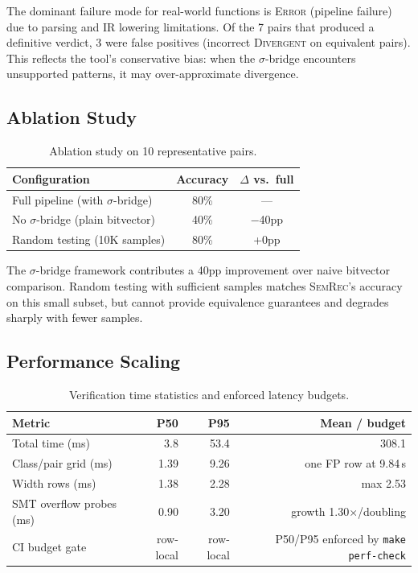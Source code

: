 \documentclass[10pt,a4paper]{article}
\begin{document}
\begin{appendices}
The dominant failure mode for real-world functions is \textsc{Error}
(pipeline failure) due to parsing and IR lowering limitations.
Of the 7 pairs that produced a definitive verdict, 3 were false
positives (incorrect \textsc{Divergent} on equivalent pairs).
This reflects the tool's conservative bias: when the $\sigma$-bridge
encounters unsupported patterns, it may over-approximate divergence.

\subsection{Ablation Study}

\begin{table}[h!]
\centering
\small
\caption{Ablation study on 10 representative pairs.}
\label{tab:ablation}
\begin{tabular}{@{}lcc@{}}
\toprule
Configuration & Accuracy & $\Delta$ vs.\ full \\
\midrule
Full pipeline (with $\sigma$-bridge) & 80\% & --- \\
No $\sigma$-bridge (plain bitvector) & 40\% & $-$40pp \\
Random testing (10K samples) & 80\% & +0pp \\
\bottomrule
\end{tabular}
\end{table}

The $\sigma$-bridge framework contributes a 40pp improvement over
naive bitvector comparison.  Random testing with sufficient samples matches
\textsc{SemRec}'s accuracy on this small subset, but cannot provide
equivalence guarantees and degrades sharply with fewer samples.

\subsection{Performance Scaling}

\begin{table}[h!]
\centering
\small
\caption{Verification time statistics and enforced latency budgets.}
\label{tab:perf}
\begin{tabular}{@{}lrrr@{}}
\toprule
Metric & P50 & P95 & Mean / budget \\
\midrule
Total time (ms) & 3.8 & 53.4 & 308.1 \\
Class/pair grid (ms) & 1.39 & 9.26 & one FP row at 9.84\,s \\
Width rows (ms) & 1.38 & 2.28 & max 2.53 \\
SMT overflow probes (ms) & 0.90 & 3.20 & growth 1.30$\times$/doubling \\
CI budget gate & row-local & row-local & P50/P95 enforced by \texttt{make perf-check} \\
\bottomrule
\end{tabular}
\end{table}


\end{appendices}
\end{document}
